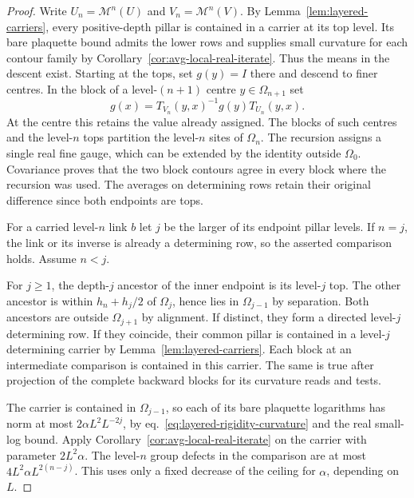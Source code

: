 \documentclass[11pt,letterpaper,reqno]{amsart}
\numberwithin{equation}{section}
\renewcommand{\eqref}[1]{\textup{eq.~\ref{#1}}}
\theoremstyle{definition}
\theoremstyle{remark}
\begin{document}
\begin{proof}
Write $U_n=\mathcal M^n(U)$ and $V_n=\mathcal M^n(V)$.
By Lemma~\ref{lem:layered-carriers}, every positive-depth pillar is
contained in a carrier at its top level. Its bare plaquette bound
admits the lower rows and supplies small curvature for each contour
family by Corollary~\ref{cor:avg-local-real-iterate}. Thus the means
in the descent exist. Starting at the tops, set $g(y)=I$ there
and descend to finer centres. In the block
of a level-$(n+1)$ centre $y\in\Omega_{n+1}$ set
\begin{equation}\label{eq:layered-rigidity-gauge}
 g(x)=T_{V_n}(y,x)^{-1}g(y)T_{U_n}(y,x).
\end{equation}
At the centre this retains the value already assigned. The blocks
of such centres and the level-$n$ tops partition the level-$n$
sites of $\Omega_n$. The recursion assigns a single real fine gauge,
which can be extended by the identity outside $\Omega_0$. Covariance
proves that the two block contours agree in every block where the
recursion was used. The averages on determining rows retain their
original difference since both endpoints are tops.

For a carried level-$n$ link $b$ let $j$ be the larger of its endpoint
pillar levels. If \(n=j\), the link or its inverse is already a
determining row, so the asserted comparison holds. Assume \(n<j\).

For \(j\ge1\), the depth-\(j\) ancestor of the inner endpoint is its
level-\(j\) top. The other ancestor is within \(h_n+h_j/2\) of
\(\Omega_j\), hence lies in \(\Omega_{j-1}\) by separation. Both
ancestors are outside \(\Omega_{j+1}\) by alignment. If distinct,
they form a directed level-\(j\) determining row. If they coincide,
their common pillar is contained in a level-\(j\) determining
carrier by Lemma~\ref{lem:layered-carriers}. Each block at an
intermediate comparison is contained in this carrier. The same is
true after projection of the complete backward blocks for its
curvature reads and tests.

The carrier is contained in \(\Omega_{j-1}\), so each of its bare
plaquette logarithms has norm at most \(2\alpha L^2L^{-2j}\), by
\eqref{eq:layered-rigidity-curvature} and the real small-log bound.
Apply Corollary~\ref{cor:avg-local-real-iterate} on the carrier with
parameter \(2L^2\alpha\). The level-\(n\) group defects in the
comparison are at most \(4L^2\alpha L^{2(n-j)}\). This uses only a
fixed decrease of the ceiling for \(\alpha\), depending on \(L\).


\end{proof}
\end{document}
